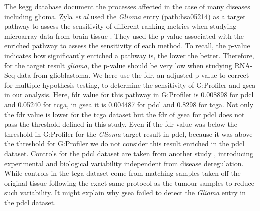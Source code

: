 The \acrshort{kegg} database document the processes affected in the case of many diseases including glioma.
Zyla \textit{et al} used the \textit{Glioma} entry (path:hsa05214) as a target pathway to assess the sensitivity of different ranking metrics when studying microarray data from brain tissue \cite*{Zyla2017}.
They used the p-value associated with the enriched pathway to assess the sensitivity of each method.
To recall, the p-value indicates how significantly enriched a pathway is, the lower the better.
Therefore, for the target result \textit{glioma}, the p-value should be very low when studying RNA-Seq data from glioblastoma.
We here use the \acrshort{fdr}, an adjusted p-value to correct for multiple hypothesis testing, to determine the sensitivity of G:Profiler and \acrshort{gsea} in our analysis.
Here, \acrshort{fdr} value for this pathway in G:Profiler is 0.008898 for \acrshort{pdcl} and 0.05240 for \acrshort{tcga}, in \acrshort{gsea} it is 0.004487 for \acrshort{pdcl} and 0.8298 for \acrshort{tcga}.
Not only the \acrshort{fdr} value is lower for the \acrshort{tcga} dataset but the \acrshort{fdr} of \acrshort{gsea} for \acrshort{pdcl} does not pass the threshold defined in this study.
Even if the \acrshort{fdr} value was below the threshold in G:Profiler for the \textit{Glioma} target result in \acrshort{pdcl}, because it was above the threshold for G:Profiler we do not consider this result enriched in the \acrshort{pdcl} dataset.
Controls for the \acrshort{pdcl} dataset are taken from another study \cite*{Lundin2018}, introducing experimental and biological variability independent from disease deregulation.
While controls in the \acrshort{tcga} dataset come from matching samples taken off the original tissue following the exact same protocol as the tumour samples to reduce such variability.
It might explain why \acrshort{gsea} failed to detect the \textit{Glioma} entry in the \acrshort{pdcl} dataset.

